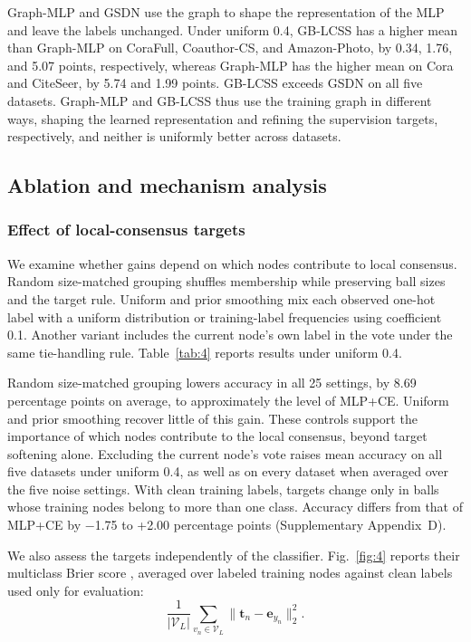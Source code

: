 \documentclass[times,review,10pt]{elsarticle}
\theoremstyle{definition}
\theoremstyle{plain}
\begin{document}
Graph-MLP and GSDN use the graph to shape the representation of the MLP and leave the labels unchanged. Under uniform 0.4, GB-LCSS has a higher mean than Graph-MLP on CoraFull, Coauthor-CS, and Amazon-Photo, by 0.34, 1.76, and 5.07 points, respectively, whereas Graph-MLP has the higher mean on Cora and CiteSeer, by 5.74 and 1.99 points. GB-LCSS exceeds GSDN on all five datasets. Graph-MLP and GB-LCSS thus use the training graph in different ways, shaping the learned representation and refining the supervision targets, respectively, and neither is uniformly better across datasets.

\subsection{Ablation and mechanism analysis}\label{sec:4.3}

\subsubsection{Effect of local-consensus targets}\label{sec:4.3.1}

We examine whether gains depend on which nodes contribute to local consensus. Random size-matched grouping shuffles membership while preserving ball sizes and the target rule. Uniform and prior smoothing mix each observed one-hot label with a uniform distribution or training-label frequencies using coefficient 0.1. Another variant includes the current node's own label in the vote under the same tie-handling rule. Table~\ref{tab:4} reports results under uniform 0.4.



Random size-matched grouping lowers accuracy in all 25 settings, by 8.69 percentage points on average, to approximately the level of MLP+CE. Uniform and prior smoothing recover little of this gain. These controls support the importance of which nodes contribute to the local consensus, beyond target softening alone. Excluding the current node's vote raises mean accuracy on all five datasets under uniform 0.4, as well as on every dataset when averaged over the five noise settings. With clean training labels, targets change only in balls whose training nodes belong to more than one class. Accuracy differs from that of MLP+CE by \ensuremath{-}1.75 to +2.00 percentage points (Supplementary Appendix~D).


We also assess the targets independently of the classifier. Fig.~\ref{fig:4} reports their multiclass Brier score \cite{ref73}, averaged over labeled training nodes against clean labels used only for evaluation:
\[
\frac{1}{|\mathcal V_L|}\sum_{v_n\in\mathcal V_L}\lVert\mathbf t_n-\mathbf e_{y_n}\rVert_2^2.
\]
\end{document}
